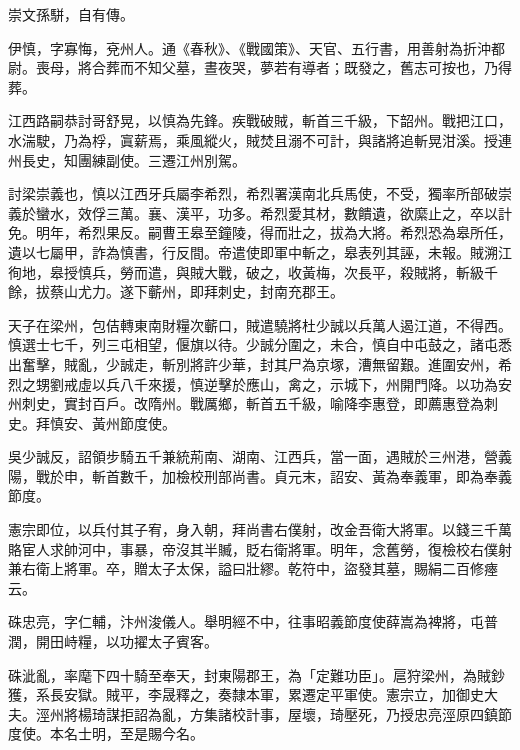 \begin{pinyinscope}
 崇文孫駢，自有傳。



 伊慎，字寡悔，兗州人。通《春秋》、《戰國策》、天官、五行書，用善射為折沖都尉。喪母，將合葬而不知父墓，晝夜哭，夢若有導者；既發之，舊志可按也，乃得葬。



 江西路嗣恭討哥舒晃，以慎為先鋒。疾戰破賊，斬首三千級，下韶州。戰把江口，水湍駛，乃為桴，寘薪焉，乘風縱火，賊焚且溺不可計，與諸將追斬晃泔溪。授連州長史，知團練副使。三遷江州別駕。



 討梁崇義也，慎以江西牙兵屬李希烈，希烈署漢南北兵馬使，不受，獨率所部破崇義於蠻水，效俘三萬。襄、漢平，功多。希烈愛其材，數饋遺，欲縻止之，卒以計免。明年，希烈果反。嗣曹王皋至鐘陵，得而壯之，拔為大將。希烈恐為皋所任，遺以七屬甲，詐為慎書，行反間。帝遣使即軍中斬之，皋表列其誣，未報。賊溯江徇地，皋授慎兵，勞而遣，與賊大戰，破之，收黃梅，次長平，殺賊將，斬級千餘，拔蔡山尤力。遂下蘄州，即拜刺史，封南充郡王。



 天子在梁州，包佶轉東南財糧次蘄口，賊遣驍將杜少誠以兵萬人遏江道，不得西。慎選士七千，列三屯相望，偃旗以待。少誠分圍之，未合，慎自中屯鼓之，諸屯悉出奮擊，賊亂，少誠走，斬別將許少華，封其尸為京塚，漕無留艱。進圍安州，希烈之甥劉戒虛以兵八千來援，慎逆擊於應山，禽之，示城下，州開門降。以功為安州刺史，實封百戶。改隋州。戰厲鄉，斬首五千級，喻降李惠登，即薦惠登為刺史。拜慎安、黃州節度使。



 吳少誠反，詔領步騎五千兼統荊南、湖南、江西兵，當一面，遇賊於三州港，營義陽，戰於申，斬首數千，加檢校刑部尚書。貞元末，詔安、黃為奉義軍，即為奉義節度。



 憲宗即位，以兵付其子宥，身入朝，拜尚書右僕射，改金吾衛大將軍。以錢三千萬賂宦人求帥河中，事暴，帝沒其半贓，貶右衛將軍。明年，念舊勞，復檢校右僕射兼右衛上將軍。卒，贈太子太保，謚曰壯繆。乾符中，盜發其墓，賜絹二百修瘞云。



 硃忠亮，字仁輔，汴州浚儀人。舉明經不中，往事昭義節度使薛嵩為裨將，屯普潤，開田峙糧，以功擢太子賓客。



 硃泚亂，率麾下四十騎至奉天，封東陽郡王，為「定難功臣」。扈狩梁州，為賊鈔獲，系長安獄。賊平，李晟釋之，奏隸本軍，累遷定平軍使。憲宗立，加御史大夫。涇州將楊琦謀拒詔為亂，方集諸校計事，屋壞，琦壓死，乃授忠亮涇原四鎮節度使。本名士明，至是賜今名。




\end{pinyinscope}
